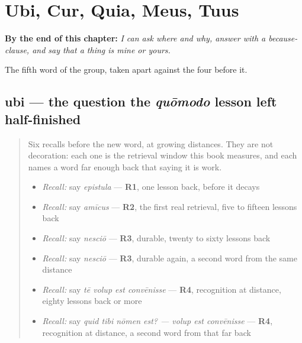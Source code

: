 
\chapter{Ubi, Cur, Quia, Meus, Tuus}
\label{ch:la-interrogatio}

\begin{chapteropening}
\textbf{By the end of this chapter:} \emph{I can ask where and why, answer with a because-clause, and say that a thing is mine or yours.}

The fifth word of the group, taken apart against the four before it.
\end{chapteropening}

\section[ubi]{ubi — the question the \emph{quōmodo} lesson left half-finished}

\label{lesson:LA-C52-ubi}



\begin{quote}
Six recalls before the new word, at growing distances. They are not decoration: each one is the retrieval window this book measures, and each names a word far enough back that saying it is work.

\begin{itemize}
\raggedright
  \item \emph{Recall:} say \emph{epistula} — \textbf{R1}, one lesson back, before it decays
  \item \emph{Recall:} say \emph{amīcus} — \textbf{R2}, the first real retrieval, five to fifteen lessons back
  \item \emph{Recall:} say \emph{nesciō} — \textbf{R3}, durable, twenty to sixty lessons back
  \item \emph{Recall:} say \emph{nesciō} — \textbf{R3}, durable again, a second word from the same distance
  \item \emph{Recall:} say \emph{tē volup est convēnisse} — \textbf{R4}, recognition at distance, eighty lessons back or more
  \item \emph{Recall:} say \emph{quid tibi nōmen est? — volup est convēnisse} — \textbf{R4}, recognition at distance, a second word from that far back
\end{itemize}
\end{quote}

